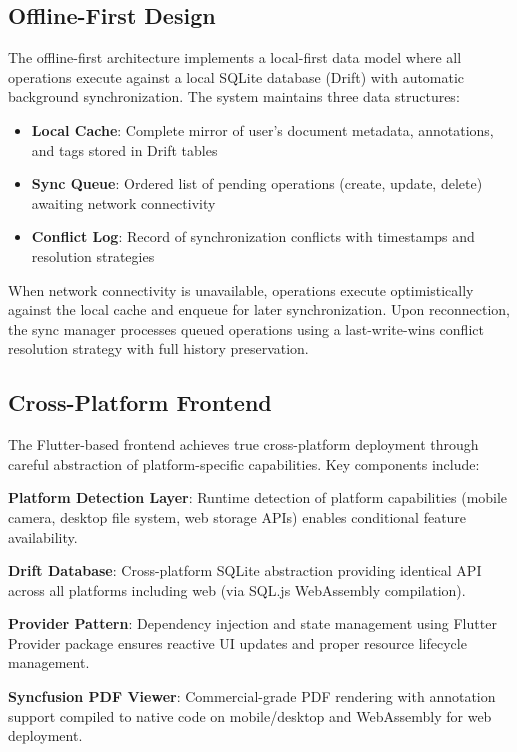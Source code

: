 \documentclass[conference]{IEEEtran}
\begin{document}
\subsection{Offline-First Design}

The offline-first architecture implements a local-first data model where all operations execute against a local SQLite database (Drift) with automatic background synchronization. The system maintains three data structures:

\begin{itemize}
\item \textbf{Local Cache}: Complete mirror of user's document metadata, annotations, and tags stored in Drift tables
\item \textbf{Sync Queue}: Ordered list of pending operations (create, update, delete) awaiting network connectivity
\item \textbf{Conflict Log}: Record of synchronization conflicts with timestamps and resolution strategies
\end{itemize}

When network connectivity is unavailable, operations execute optimistically against the local cache and enqueue for later synchronization. Upon reconnection, the sync manager processes queued operations using a last-write-wins conflict resolution strategy with full history preservation.

\subsection{Cross-Platform Frontend}

The Flutter-based frontend achieves true cross-platform deployment through careful abstraction of platform-specific capabilities. Key components include:

\textbf{Platform Detection Layer}: Runtime detection of platform capabilities (mobile camera, desktop file system, web storage APIs) enables conditional feature availability.

\textbf{Drift Database}: Cross-platform SQLite abstraction providing identical API across all platforms including web (via SQL.js WebAssembly compilation).

\textbf{Provider Pattern}: Dependency injection and state management using Flutter Provider package ensures reactive UI updates and proper resource lifecycle management.

\textbf{Syncfusion PDF Viewer}: Commercial-grade PDF rendering with annotation support compiled to native code on mobile/desktop and WebAssembly for web deployment.
\end{document}
